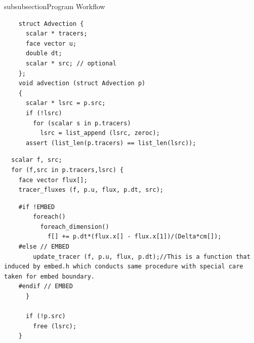 \begin{codesection}{subsubsection}{Program Workflow}

\begin{verbatim}
    struct Advection {
      scalar * tracers;
      face vector u;
      double dt;
      scalar * src; // optional
    };
    void advection (struct Advection p)
    {
      scalar * lsrc = p.src;
      if (!lsrc)
        for (scalar s in p.tracers)
          lsrc = list_append (lsrc, zeroc);
      assert (list_len(p.tracers) == list_len(lsrc));
\end{verbatim}

\codearrow


\begin{verbatim}
  scalar f, src;
  for (f,src in p.tracers,lsrc) {
    face vector flux[];
    tracer_fluxes (f, p.u, flux, p.dt, src);
\end{verbatim}

\codearrow


\begin{verbatim}
    #if !EMBED
        foreach()
          foreach_dimension()
            f[] += p.dt*(flux.x[] - flux.x[1])/(Delta*cm[]);
    #else // EMBED
        update_tracer (f, p.u, flux, p.dt);//This is a function that induced by embed.h which conducts same procedure with special care taken for embed boundary.
    #endif // EMBED
      }

      if (!p.src)
        free (lsrc);
    }
\end{verbatim}

\end{codesection}

